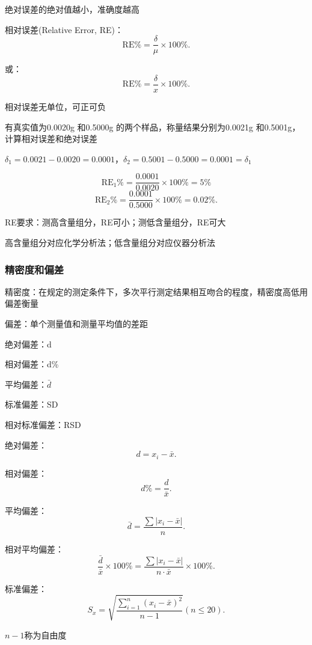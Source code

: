 绝对误差的绝对值越小，准确度越高

相对误差(Relative Error, RE)：\[
    \text{RE}\% = \frac{\delta}{\mu}\times 100\%
.\] 

或：\[
    \text{RE}\% = \frac{\delta}{x}\times 100\%
.\]

相对误差无单位，可正可负
\begin{eg}
    有真实值为0.0020g 和0.5000g 的两个样品，称量结果分别为0.0021g 和0.5001g，计算相对误差和绝对误差

$\delta_1=0.0021-0.0020=0.0001$，$\delta_2=0.5001-0.5000=0.0001=\delta_1$

\[
    \text{RE}_1\%=\frac{0.0001}{0.0020}\times 100\%=5\%
\]
\[
    \text{RE}_2\%=\frac{0.0001}{0.5000}\times 100\%=0.02\%
.\]  
\end{eg}
\begin{notation}
    RE要求：测高含量组分，RE可小；测低含量组分，RE可大

    高含量组分对应化学分析法；低含量组分对应仪器分析法
\end{notation}
\subsubsection{精密度和偏差}%
\label{subsub:精密度和偏差}
\begin{defi}
    精密度：在规定的测定条件下，多次平行测定结果相互吻合的程度，精密度高低用偏差衡量

    偏差：单个测量值和测量平均值的差距
\end{defi}
\begin{defi}
    绝对偏差：d

    相对偏差：d\%

    平均偏差：$\bar{d}$

    标准偏差：SD

    相对标准偏差：RSD
\end{defi}

绝对偏差：\[
    d=x_i-\bar{x}
.\]

相对偏差：\[
    d\%=\frac{d}{\bar{x}}
.\]

平均偏差：\[
    \bar{d}=\frac{\sum |x_{i}-\bar{x}|}{n}
.\]

相对平均偏差：\[
    \frac{\bar{d}}{\bar{x}}\times 100\%=\frac{\sum |x_{i}-\bar{x}|}{n\cdot \bar{x}}\times 100\%
.\]

标准偏差：\[
    S_x=\sqrt{\frac{\displaystyle{\sum_{i=1}^{n} \left( x_{i}-\bar{x} \right) ^2}}{n-1}} \left(n\le 20  \right) 
.\] 

$n-1 $称为自由度

